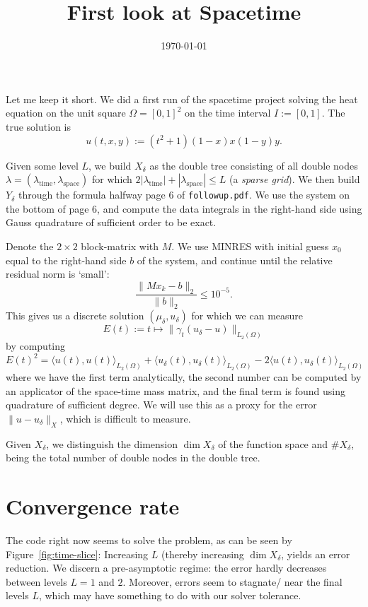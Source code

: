 \documentclass[11pt,a4paper]{amsart}
\date{\today}
\theoremstyle{definition}
\newcommand{\inp}[2]{\langle #1, #2 \rangle}
\begin{document}
\title{First look at Spacetime}
\maketitle

Let me keep it short. We did a first run of the spacetime project solving the
heat equation on the unit square $\Omega = [0,1]^2$ on the time interval
$I := [0,1]$. The true solution is 
\[
  u(t,x,y) := (t^2 + 1) (1-x)x(1-y)y.
\]

Given some level $L$, we build $X_\delta$ as the double tree consisting of all
double nodes $\lambda = (\lambda_{\text{time}}, \lambda_{\text{space}})$ for
which $2|\lambda_{\text{time}}| + |\lambda_{\text{space}}| \leq L$ (a \emph{sparse grid}).
We then build $Y_\delta$ through the formula halfway page 6 of \texttt{followup.pdf}.
We use the system on the bottom of page 6, and compute the data integrals in the
right-hand side using Gauss quadrature of sufficient order to be exact.

Denote the $2 \times 2$ block-matrix with $M$. We use MINRES with initial guess $x_0$
equal to the right-hand side $b$ of the system, and continue until the relative residual norm is `small':
\[
  \frac{\|Mx_k - b\|_2}{\|b\|_2} \leq 10^{-5}.
\]
This gives us a discrete solution $(\mu_\delta, u_\delta)$ for which we can measure
\[
  E(t) := t \mapsto \|\gamma_t(u_\delta - u)\|_{L_2(\Omega)}
\]
by computing
\[
  E(t)^2 = \inp{u(t)}{u(t)}_{L_2(\Omega)} + \inp{u_\delta(t)}{u_\delta(t)}_{L_2(\Omega)} - 2 \inp{u(t)}{u_\delta(t)}_{L_2(\Omega)}
\]
where we have the first term analytically, the second number can be computed by
an applicator of the space-time mass matrix, and the final term is found
using quadrature of sufficient degree. We will use this as a proxy for the error
$\|u - u_\delta\|_X$, which is difficult to measure.

Given $X_\delta$, we distinguish the dimension $\dim X_\delta$ of the function space
and $\# X_\delta$, being the total number of double nodes in the double tree.

\section*{Convergence rate}
The code right now seems to solve the problem, as can be seen by Figure~\ref{fig:time-slice}:
Increasing $L$ (thereby increasing $\dim X_\delta$, yields an error reduction.
We discern a pre-asymptotic regime: the error hardly decreases between levels $L=1$
and $2$. Moreover, errors seem to stagnate/ near the final levels $L$, which may
have something to do with our solver tolerance.
\end{document}
